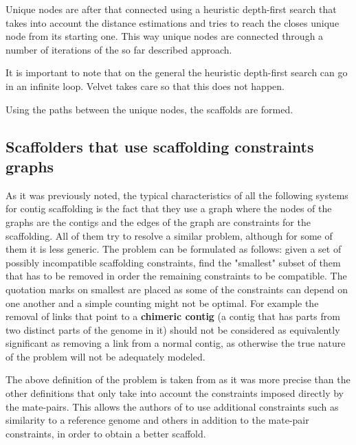\documentclass[11pt]{article}
\begin{document}
Unique nodes are after that connected using a heuristic depth-first search that
takes into account the distance estimations and tries to reach the closes unique
node from its starting one. This way unique nodes are connected through a number
of iterations of the so far described approach.

It is important to note that on the general the heuristic depth-first search can
go in an infinite loop. Velvet takes care so that this does not happen.

Using the paths between the unique nodes, the scaffolds are formed.



\subsection{Scaffolders that use scaffolding constraints graphs} %
\label{sub:Scaffolders that use scaffolding constraints graphs}
As it was previously noted, the typical characteristics of all the following
systems for contig scaffolding is the fact that they use a graph where the nodes
of the graphs are the contigs and the edges of the graph are constraints for the
scaffolding. All of them try to resolve a similar problem, although for some of
them it is less generic. The problem can be formulated as follows: given a set
of possibly incompatible scaffolding constraints, find the "smallest" subset of
them that has to be removed in order the remaining constraints to be compatible.
The quotation marks on smallest are placed as some of the constraints can depend
on one another and a simple counting might not be optimal. For example the
removal of links that point to a \textbf{chimeric contig} (a contig that has
parts from two distinct parts of the genome in it) should not be considered as
equivalently significant as removing a link from a normal contig, as otherwise
the true nature of the problem will not be adequately modeled.

The above definition of the problem is taken from \cite{grass} as it was more
precise than the other definitions that only take into account the constraints
imposed directly by the mate-pairs. This allows the authors of \cite{grass} to
use additional constraints such as similarity to a reference genome and others
in addition to the mate-pair constraints, in order to obtain a better scaffold.
\end{document}
